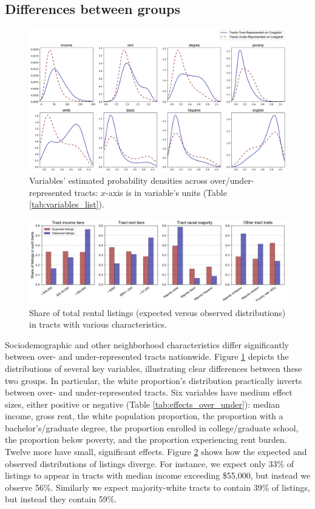 \documentclass[11pt,onecolumn]{article} %
\begin{document}
\subsection{Differences between groups}

\begin{figure}[tbp]
	\centering
	\includegraphics[width=1\textwidth]{fig_variable_distributions.png}
	\caption{Variables' estimated probability densities across over/under- represented tracts: $x$-axis is in variable's units (Table \ref{tab:variables_list}).}
	\label{fig:variable_distributions}
\end{figure}

\begin{figure}[tbp]
	\centering
	\includegraphics[width=1\textwidth]{fig_tract_shares_grouped.png}
	\caption{Share of total rental listings (expected versus observed distributions) in tracts with various characteristics.}
	\label{fig:tract_shares}
\end{figure}

Sociodemographic and other neighborhood characteristics differ significantly between over- and under-represented tracts nationwide. Figure \ref{fig:variable_distributions} depicts the distributions of several key variables, illustrating clear differences between these two groups. In particular, the white proportion's distribution practically inverts between over- and under-represented tracts. Six variables have medium effect sizes, either positive or negative (Table \ref{tab:effects_over_under}): median income, gross rent, the white population proportion, the proportion with a bachelor's/graduate degree, the proportion enrolled in college/graduate school, the proportion below poverty, and the proportion experiencing rent burden. Twelve more have small, significant effects. Figure \ref{fig:tract_shares} shows how the expected and observed distributions of listings diverge. For instance, we expect only 33\% of listings to appear in tracts with median income exceeding \$55,000, but instead we observe 56\%. Similarly we expect majority-white tracts to contain 39\% of listings, but instead they contain 59\%.
\end{document}
